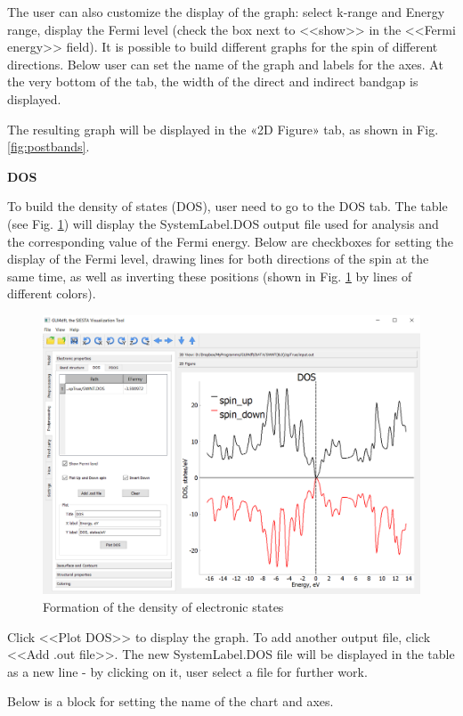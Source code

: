\documentclass{article}
\begin{document}
The user can also customize the display of the graph: select k-range and Energy range, display the Fermi level (check the box next to <<show>> in the <<Fermi energy>> field). It is possible to build different graphs for the spin of different directions. Below user can set the name of the graph and labels for the axes. At the very bottom of the tab, the width of the direct and indirect bandgap is displayed.

The resulting graph will be displayed in the «2D Figure» tab, as shown in Fig. \ref{fig:postbands}.


\textbf{DOS}

To build the density of states (DOS), user need to go to the DOS tab. The table (see Fig. \ref{fig:postdos}) will display the SystemLabel.DOS output file used for analysis and the corresponding value of the Fermi energy. Below are checkboxes for setting the display of the Fermi level, drawing lines for both directions of the spin at the same time, as well as inverting these positions (shown in Fig. \ref{fig:postdos} by lines of different colors).

\begin{figure}[h!]
	\centering
	\includegraphics[width=12.0cm]{post_dos}
	\caption{Formation of the density of electronic states}
	\label{fig:postdos}
\end{figure}

Click <<Plot DOS>> to display the graph. To add another output file, click <<Add .out file>>. The new SystemLabel.DOS file will be displayed in the table as a new line - by clicking on it, user select a file for further work.

Below is a block for setting the name of the chart and axes.
\end{document}
